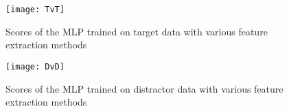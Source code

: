 
\begin{figure}[H]
		\centering
		\texttt{[image: TvT]}
		\caption{Scores of the MLP trained on target data with various feature extraction methods}
		\label{tvt}
\end{figure}
\begin{figure}[H]
		\centering
		\texttt{[image: DvD]}
		\caption{Scores of the MLP trained on distractor data with various feature extraction methods}
		\label{dvd}
\end{figure}


